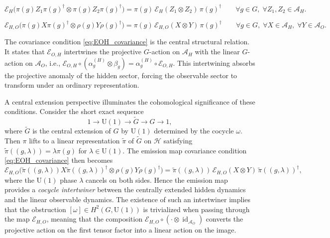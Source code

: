 \documentclass[12pt,a4paper]{article}
\begin{document}
\begin{equation}
\mathcal{E}_H\bigl( \pi(g) Z_1 \pi(g)^\dagger \otimes \pi(g) Z_2 \pi(g)^\dagger \bigr) = \pi(g) \, \mathcal{E}_H(Z_1 \otimes Z_2) \, \pi(g)^\dagger \qquad \forall g \in G,\; \forall Z_1, Z_2 \in \mathcal{A}_H.
\label{eq:Eh_equivariance}
\end{equation}

\begin{equation}
\mathcal{E}_{H,O}\bigl( \pi(g) X \pi(g)^\dagger \otimes \rho(g) Y \rho(g)^\dagger \bigr) = \pi(g) \, \mathcal{E}_{H,O}(X \otimes Y) \, \pi(g)^\dagger \qquad \forall g \in G,\; \forall X \in \mathcal{A}_H,\; \forall Y \in \mathcal{A}_O.
\label{eq:EOH_covariance}
\end{equation}

The covariance condition \eqref{eq:EOH_covariance} is the central structural relation. It states that $\mathcal{E}_{O,H}$ intertwines the projective $G$-action on $\mathcal{A}_H$ with the linear $G$-action on $\mathcal{A}_O$, i.e., $\mathcal{E}_{O,H} \circ (\alpha_g^{(H)} \otimes \beta_g) = \alpha_g^{(H)} \circ \mathcal{E}_{O,H}$. This intertwining absorbs the projective anomaly of the hidden sector, forcing the observable sector to transform under an ordinary representation.

A central extension perspective illuminates the cohomological significance of these conditions. Consider the short exact sequence
\[
1 \longrightarrow \mathrm{U}(1) \longrightarrow \widetilde{G} \longrightarrow G \longrightarrow 1,
\]
where \(\widetilde{G}\) is the central extension of \(G\) by \(\mathrm{U}(1)\) determined by the cocycle \(\omega\). Then \(\pi\) lifts to a linear representation \(\widetilde{\pi}\) of \(\widetilde{G}\) on \(\mathcal{H}\) satisfying \(\widetilde{\pi}((g,\lambda)) = \lambda \pi(g)\) for \(\lambda \in \mathrm{U}(1)\). The emission map covariance condition \eqref{eq:EOH_covariance} then becomes
\[
\mathcal{E}_{H,O}\bigl( \widetilde{\pi}((g,\lambda)) X \widetilde{\pi}((g,\lambda))^\dagger \otimes \rho(g) Y \rho(g)^\dagger \bigr) = \widetilde{\pi}((g,\lambda)) \, \mathcal{E}_{H,O}(X \otimes Y) \, \widetilde{\pi}((g,\lambda))^\dagger,
\]
where the \(\mathrm{U}(1)\) phase \(\lambda\) cancels on both sides. Hence the emission map provides a \textit{cocycle intertwiner} between the centrally extended hidden dynamics and the linear observable dynamics. The existence of such an intertwiner implies that the obstruction \([\omega] \in H^2(G, \mathrm{U}(1))\) is trivialized when passing through the map \(\mathcal{E}_{H,O}\), meaning that the composition \(\mathcal{E}_{H,O} \circ (\cdot \otimes \operatorname{id}_{\mathcal{A}_O})\) converts the projective action on the first tensor factor into a linear action on the image.
\end{document}
